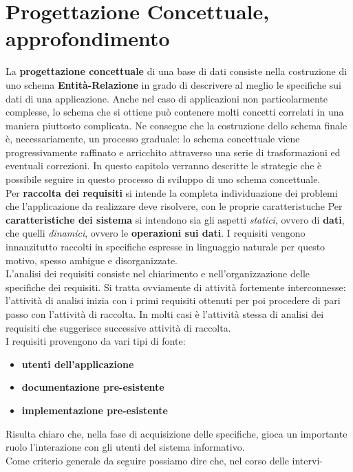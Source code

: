\documentclass[a4paper,12pt, oneside]{book}
\begin{document}
\section{Progettazione Concettuale, approfondimento}
La \textbf{progettazione concettuale} di una base di dati consiste nella costruzione di uno
schema\textbf{ Entità-Relazione} in grado di descrivere al meglio le specifiche sui dati di
una applicazione. Anche nel caso di applicazioni non particolarmente complesse,
lo schema che si ottiene può contenere molti concetti correlati in una maniera
piuttosto complicata. Ne consegue che la costruzione dello schema finale è, necessariamente,
un processo graduale: lo schema concettuale viene progressivamente
raffinato e arricchito attraverso una serie di trasformazioni ed eventuali correzioni.
In questo capitolo verranno descritte le strategie che è possibile seguire in questo
processo di sviluppo di uno schema concettuale.
\\Per \textbf{raccolta dei requisiti} si intende la completa individuazione dei problemi
che l'applicazione da realizzare deve risolvere, con le proprie caratteristuche
Per \textbf{caratteristiche dei sistema} si intendono sia gli aspetti \textit{statici}, ovvero di \textbf{dati}, che quelli \textit{dinamici}, ovvero le \textbf{operazioni sui dati}. I requisiti vengono innanzitutto raccolti in specifiche espresse in linguaggio naturale per questo motivo, spesso ambigue e disorganizzate.\\
L'analisi dei requisiti consiste nel chiarimento e nell'organizzazione delle specifiche dei requisiti. Si tratta
ovviamente di attività fortemente interconnesse: l'attività di analisi inizia con i
primi requisiti ottenuti per poi procedere di pari passo con l'attività di raccolta.
In molti casi è l'attività stessa di analisi dei requisiti che suggerisce successive
attività di raccolta.\\
I requisiti provengono da vari tipi di fonte:
\begin{itemize}
\item \textbf{utenti dell'applicazione}
\item \textbf{documentazione pre-esistente}
\item \textbf{implementazione pre-esistente}
\end{itemize}
Risulta chiaro che, nella fase di acquisizione delle specifiche, gioca un importante ruolo l'interazione con gli utenti del sistema informativo.\\
Come criterio generale da seguire possiamo dire che, nel corso delle intervi-
\end{document}
